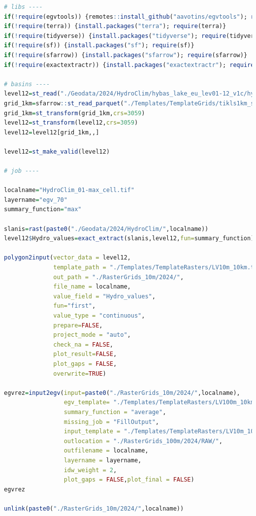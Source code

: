 \documentclass[
]{book}
\begin{document}
\begin{lstlisting}[language=R]
# libs ----
if(!require(egvtools)) {remotes::install_github("aavotins/egvtools"); require(egvtools)}
if(!require(terra)) {install.packages("terra"); require(terra)}
if(!require(tidyverse)) {install.packages("tidyverse"); require(tidyverse)}
if(!require(sf)) {install.packages("sf"); require(sf)}
if(!require(sfarrow)) {install.packages("sfarrow"); require(sfarrow)}
if(!require(exactextractr)) {install.packages("exactextractr"); require(exactextractr)}

# basins ----
level12=st_read("./Geodata/2024/HydroClim/hybas_lake_eu_lev01-12_v1c/hybas_lake_eu_lev12_v1c.shp")
grid_1km=sfarrow::st_read_parquet("./Templates/TemplateGrids/tikls1km_sauzeme.parquet")
grid_1km=st_transform(grid_1km,crs=3059)
level12=st_transform(level12,crs=3059)
level12=level12[grid_1km,,]

level12=st_make_valid(level12)

# job ----

localname="HydroClim_01-max_cell.tif"
layername="egv_70"
summary_function="max"
  
slanis=rast(paste0("./Geodata/2024/HydroClim/",localname))
level12$Hydro_values=exact_extract(slanis,level12,fun=summary_function)
  
polygon2input(vector_data = level12,
              template_path = "./Templates/TemplateRasters/LV10m_10km.tif",
              out_path = "./RasterGrids_10m/2024/",
              file_name = localname,
              value_field = "Hydro_values",
              fun="first",
              value_type = "continuous",
              prepare=FALSE,
              project_mode = "auto",
              check_na = FALSE,
              plot_result=FALSE,
              plot_gaps = FALSE,
              overwrite=TRUE)
  
egvrez=input2egv(input=paste0("./RasterGrids_10m/2024/",localname),
                 egv_template= "./Templates/TemplateRasters/LV100m_10km.tif",
                 summary_function = "average",
                 missing_job = "FillOutput",
                 input_template = "./Templates/TemplateRasters/LV10m_10km.tif",
                 outlocation = "./RasterGrids_100m/2024/RAW/",
                 outfilename = localname,
                 layername = layername,
                 idw_weight = 2,
                 plot_gaps = FALSE,plot_final = FALSE)
egvrez
  
unlink(paste0("./RasterGrids_10m/2024/",localname))
\end{lstlisting}
\end{document}
